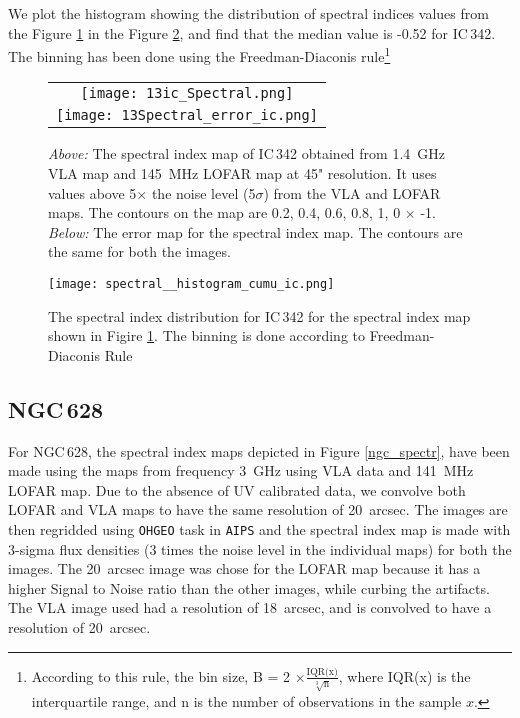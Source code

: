 \documentclass[../main/thesis_msc.tex]{subfiles}
\begin{document}
We plot the histogram showing the distribution of spectral indices values from the Figure \ref{ic342_spectr} in the Figure \ref{icsp}, and find that the median value is -0.52 for IC\,342. The binning has been done using the Freedman-Diaconis rule\footnote{According to this rule, the bin size, B = 2 $\times \frac{\textrm{IQR(x)}}{\sqrt[3]{\textrm{n}}}$, where IQR(x) is the interquartile range, and n is the number of observations in the sample $x$.}\\
\begin{figure}
  \centering
  \begin{tabular}{@{}c@{}}
    \texttt{[image: 13ic\_Spectral.png]} \\[\abovecaptionskip]
    \texttt{[image: 13Spectral\_error\_ic.png]} \\[\abovecaptionskip]
  \end{tabular}
  \caption{\textit{Above:} The spectral index map of IC\,342 obtained from 1.4~GHz VLA map and 145~MHz LOFAR map at 45" resolution. It uses values above 5$\times$ the noise level (5$\sigma$) from the VLA and LOFAR maps. The contours on the map are 0.2, 0.4, 0.6, 0.8, 1, 0 $\times$ -1. \textit{Below:} The error map for the spectral index map. The contours are the same  for both the images.}
	\label{ic342_spectr}
\end{figure}

\begin{figure}
\centering
\texttt{[image: spectral\_\_histogram\_cumu\_ic.png]}
\caption{The spectral index distribution for IC\,342 for the spectral index map shown in Figire \ref{ic342_spectr}. The binning is done according to  Freedman-Diaconis Rule \citep{Freedman1981}}
\label{icsp}
\end{figure}

\subsection{NGC\,628}
For NGC\,628, the spectral index maps depicted in Figure \ref{ngc_spectr}, have been made using the maps from frequency 3~GHz using VLA data and 141~MHz LOFAR map. Due to the absence of UV calibrated data, we convolve both LOFAR and VLA maps to have the same resolution of 20~arcsec. The images are then regridded using \verb|OHGEO| task in \verb|AIPS| and the spectral index map is made with 3-sigma flux densities (3 times the noise level in the individual maps) for both the images. The 20~arcsec image was chose for the LOFAR map because it has a higher Signal to Noise ratio than the other images, while curbing the artifacts. The VLA image used had a resolution of 18~arcsec, and is convolved to have a resolution of 20~arcsec. \\
\end{document}
